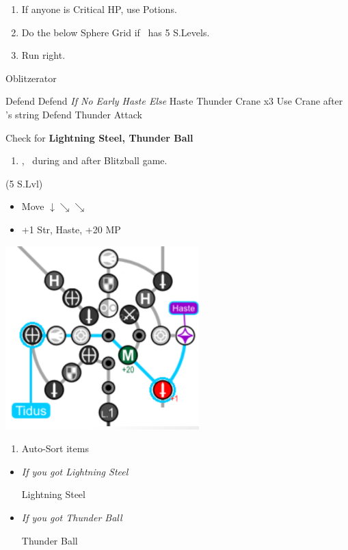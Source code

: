 \begin{enumerate}[resume]
	\item If anyone is Critical HP, use Potions.
	\item Do the below Sphere Grid if \tidus\ has 5 S.Levels.
	\item Run right. 
\end{enumerate}
\begin{battle}[3000]{Oblitzerator}
	\begin{itemize}
		\kimahrif Defend
		\tidusf Defend \textit{If No Early Haste Else} Haste \lulu
		\luluf Thunder Crane x3
		\tidusf Use Crane after \lulu's string
		\kimahrif Defend
		\luluf Thunder
		\tidusf Attack
	\end{itemize}
	Check for \textbf{Lightning Steel, Thunder Ball}
\end{battle}
\begin{enumerate}[resume]
	\item \cs[2:00], \sd\ during and after Blitzball game.
\end{enumerate}
\vfill
\begin{spheregrid}
	\begin{itemize}
		\tidusf (5 S.Lvl)
		\begin{itemize}
			\item Move $\downarrow \searrow\searrow$
			\item +1 Str, Haste, +20 MP
		\end{itemize}
	\end{itemize}
	\includegraphics{graphics/haste}
\end{spheregrid}
\begin{enumerate}[resume]
	\item Auto-Sort items
\end{enumerate}
\begin{equip}
	\begin{itemize}
		\item \textit{If you got Lightning Steel}
		      \begin{itemize}
			      \tidusf Lightning Steel
		      \end{itemize}
		\item \textit{If you got Thunder Ball}
		      \begin{itemize}
			      \wakkaf Thunder Ball
		      \end{itemize}
	\end{itemize}
\end{equip}
